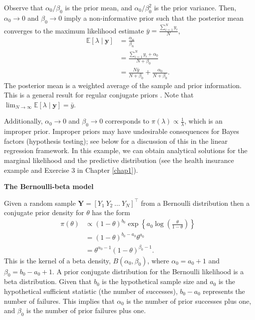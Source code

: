 \begin{enumerate}
Observe that $\alpha_0/\beta_0$ is the prior mean, and $\alpha_0/\beta_0^2$ is the prior variance. Then, $\alpha_0\rightarrow 0$ and $\beta_0\rightarrow 0$ imply a non-informative prior such that the posterior mean converges to the maximum likelihood estimate $\bar{y}=\frac{\sum_{i=1}^N y_i}{N}$,
\begin{align}
	\mathbb{E}\left[\lambda\mid \bm{y}\right]&=\frac{\alpha_n}{\beta_n}\nonumber\\
	&=\frac{\sum_{i=1}^Ny_i+\alpha_0}{N+\beta_0}\nonumber\\
	&=\frac{N\bar{y}}{N+\beta_0}+\frac{\alpha_0}{N+\beta_0}.\nonumber
\end{align}
The posterior mean is a weighted average of the sample and prior information. This is a general result for regular conjugate priors \cite{diaconis1979conjugate}. Note that \( \lim_{N \to \infty} \mathbb{E}[\lambda \mid \bm{y}] = \bar{y} \).

Additionally, \( \alpha_0 \to 0 \) and \( \beta_0 \to 0 \) corresponds to \( \pi(\lambda) \propto \frac{1}{\lambda} \), which is an improper prior. Improper priors may have undesirable consequences for Bayes factors (hypothesis testing); see below for a discussion of this in the linear regression framework. In this example, we can obtain analytical solutions for the marginal likelihood and the predictive distribution (see the health insurance example and Exercise 3 in Chapter \ref{chap1}).

\textbf{The Bernoulli-beta model}

Given a random sample $\bm{Y}=[Y_1 \ Y_2 \ \dots \ Y_N]^{\top}$ from a Bernoulli distribution then a conjugate prior density for $\theta$ has the form 
\begin{align}
	\pi(\theta)&\propto (1-\theta)^{b_0} \exp\left\{a_0\log\left(\frac{\theta}{1-\theta}\right)\right\}\nonumber\\
	& = (1-\theta)^{b_0-a_0}\theta^{a_0}\nonumber\\
	& = \theta^{\alpha_0-1}(1-\theta)^{\beta_0-1}.\nonumber
\end{align}
This is the kernel of a beta density, \( B(\alpha_0, \beta_0) \), where \( \alpha_0 = a_0 + 1 \) and \( \beta_0 = b_0 - a_0 + 1 \). A prior conjugate distribution for the Bernoulli likelihood is a beta distribution. Given that \( b_0 \) is the hypothetical sample size and \( a_0 \) is the hypothetical sufficient statistic (the number of successes), \( b_0 - a_0 \) represents the number of failures. This implies that \( \alpha_0 \) is the number of prior successes plus one, and \( \beta_0 \) is the number of prior failures plus one.


\end{enumerate}
